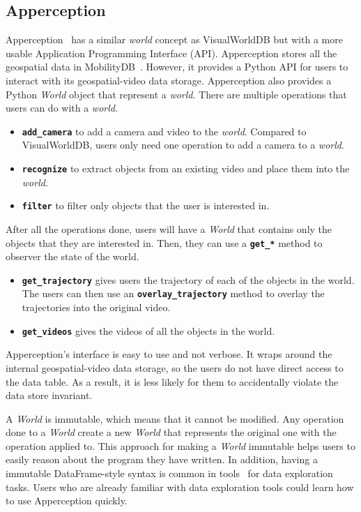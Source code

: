 \subsection{Apperception}
Apperception~\cite{ge:apperception} has a similar \emph{world} concept as VisualWorldDB but with a more usable Application Programming Interface (API).
Apperception stores all the geospatial data in MobilityDB~\cite{zimanyi:mobility}. However, it provides a Python API for users to interact with its geospatial-video data storage.
Apperception also provides a Python \emph{World} object that represent a \emph{world}.
There are multiple operations that users can do with a \emph{world}.
\begin{itemize}
    \item
    \textbf{\texttt{add\_camera}} to add a camera and video to the \emph{world}.
    Compared to VisualWorldDB, users only need one operation to add a camera to a \emph{world}.
    \item
    \textbf{\texttt{recognize}} to extract objects from an existing video and place them into the \emph{world}.
    \item
    \textbf{\texttt{filter}} to filter only objects that the user is interested in.
\end{itemize}
After all the operations done, users will have a \emph{World} that contains only the objects that they are interested in.
Then, they can use a \textbf{\texttt{get\_*}} method to observer the state of the world.
\begin{itemize}
    \item
    \textbf{\texttt{get\_trajectory}} gives users the trajectory of each of the objects in the world.
    The users can then use an \textbf{\texttt{overlay\_trajectory}} method to overlay the trajectories into the original video.
    \item
    \textbf{\texttt{get\_videos}} gives the videos of all the objects in the world.
\end{itemize}

Apperception's interface is easy to use and not verbose.
It wraps around the internal geospatial-video data storage,
so the users do not have direct access to the data table.
As a result, it is less likely for them to accidentally violate the data store invariant.

A \emph{World} is immutable, which means that it cannot be modified.
Any operation done to a \emph{World} create a new \emph{World} that represents the original one with the operation applied to.
This approach for making a \emph{World} immutable helps users to easily reason about the program they have written.
In addition, having a immutable DataFrame-style syntax is common in tools~\cite{mckinney:pandas, pandas, wickham:dplyr} for data exploration tasks.
Users who are already familiar with data exploration tools could learn how to use Apperception quickly.

